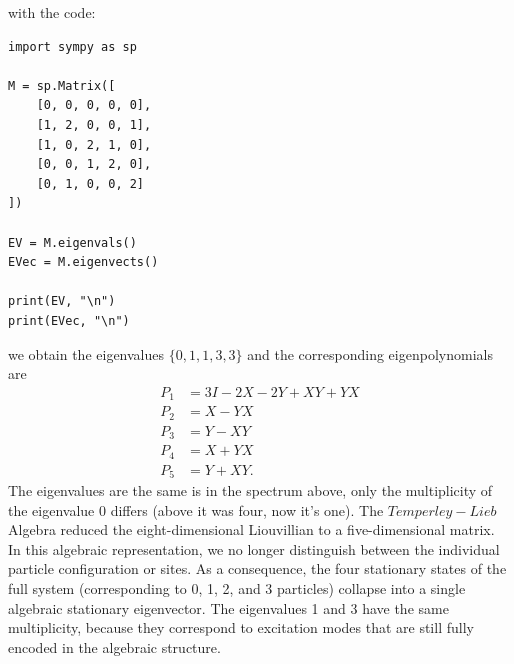 \documentclass{article}
\begin{document}
with the code:
\begin{verbatim}
import sympy as sp

M = sp.Matrix([
    [0, 0, 0, 0, 0],
    [1, 2, 0, 0, 1],
    [1, 0, 2, 1, 0],
    [0, 0, 1, 2, 0],
    [0, 1, 0, 0, 2]
])

EV = M.eigenvals()
EVec = M.eigenvects()

print(EV, "\n")
print(EVec, "\n")
\end{verbatim}
we obtain the eigenvalues $\{0, 1, 1, 3, 3\}$ and the corresponding eigenpolynomials are
\begin{align}
    P_1 &= 3I - 2X - 2Y + XY + YX\\
    P_2 &= X - YX\\
    P_3 &= Y - XY\\
    P_4 &= X + YX\\
    P_5 &= Y + XY.
\end{align}
The eigenvalues are the same is in the spectrum above, only the multiplicity of the eigenvalue $0$ differs (above it was four, now it's one). The $Temperley-Lieb$ Algebra reduced the eight-dimensional Liouvillian to a five-dimensional matrix. In this algebraic representation, we no longer distinguish between the individual particle configuration or sites.
As a consequence, the four stationary states of the full system (corresponding to 0, 1, 2, and 3 particles) collapse into a single algebraic stationary eigenvector. The eigenvalues 1 and 3 have the same multiplicity, because they correspond to excitation modes that are still fully encoded in the algebraic structure.
\end{document}
